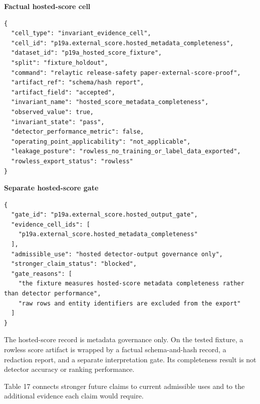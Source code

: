 \documentclass[11pt]{article}
\begin{document}
\textbf{Factual hosted-score cell}

\begin{Verbatim}[frame=single,framesep=6pt,fontsize=\footnotesize,breaklines=true,breakanywhere=true,breaksymbolleft={}]
{
  "cell_type": "invariant_evidence_cell",
  "cell_id": "p19a.external_score.hosted_metadata_completeness",
  "dataset_id": "p19a_hosted_score_fixture",
  "split": "fixture_holdout",
  "command": "relaytic release-safety paper-external-score-proof",
  "artifact_ref": "schema/hash report",
  "artifact_field": "accepted",
  "invariant_name": "hosted_score_metadata_completeness",
  "observed_value": true,
  "invariant_state": "pass",
  "detector_performance_metric": false,
  "operating_point_applicability": "not_applicable",
  "leakage_posture": "rowless_no_training_or_label_data_exported",
  "rowless_export_status": "rowless"
}
\end{Verbatim}


\textbf{Separate hosted-score gate}

\begin{Verbatim}[frame=single,framesep=6pt,fontsize=\footnotesize,breaklines=true,breakanywhere=true,breaksymbolleft={}]
{
  "gate_id": "p19a.external_score.hosted_output_gate",
  "evidence_cell_ids": [
    "p19a.external_score.hosted_metadata_completeness"
  ],
  "admissible_use": "hosted detector-output governance only",
  "stronger_claim_status": "blocked",
  "gate_reasons": [
    "the fixture measures hosted-score metadata completeness rather than detector performance",
    "raw rows and entity identifiers are excluded from the export"
  ]
}
\end{Verbatim}


The hosted-score record is metadata governance only. On the tested fixture, a rowless score artifact is wrapped by a factual schema-and-hash record, a redaction report, and a separate interpretation gate. Its completeness result is not detector accuracy or ranking performance.

Table 17 connects stronger future claims to current admissible uses and to the additional evidence each claim would require.
\end{document}
